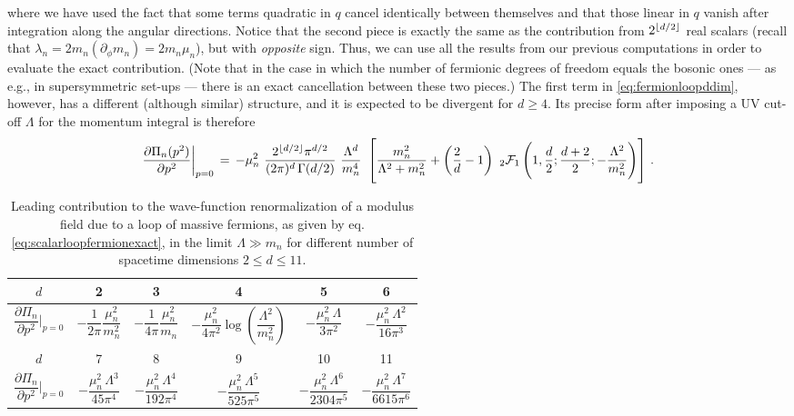 where we have used the fact that some terms quadratic in $q$ cancel identically between themselves and that those linear in $q$ vanish after integration along the angular directions. Notice that the second piece is exactly the same as the contribution from $2^{\lfloor d/2 \rfloor}$ real scalars (recall that $\lambda_n= 2 m_n (\partial_\phi m_n)=2 m_n \mu_n$), but with \emph{opposite} sign. Thus, we can use all the results from our previous computations in order to evaluate the exact contribution. (Note that in the case in which the number of fermionic degrees of freedom equals the bosonic ones --- as e.g., in supersymmetric set-ups --- there is an exact cancellation between these two pieces.) The first term in \eqref{eq:fermionloopddim}, however, has a different (although similar) structure, and it is expected to be divergent for $d\geq 4$. Its precise form after imposing a UV cut-off $\Lambda$ for the momentum integral is therefore
%
\begin{equation}
			\frac{\partial \Pi_n(p^2)}{\partial p^2} \bigg\rvert_{p=0}  \, =  \, - \mu_n^2  \ \frac{ \fdim \pi^{d/2}  }{  (2 \pi)^d \, \Gamma(d/2) } \ \frac{\Lambda^d}{m_n^4} \  \left[  \frac{m_n^2}{\Lambda^2+m_n^2}  + \left(\frac{2}{d}-1\right) \ _2{\cal F}_1\left( 1,\frac{d}{2};\frac{d+2}{2}; -\frac{\Lambda^2}{m_n^2}\right) \right]  \, .
\label{eq:scalarloopfermionexact}
\end{equation}
%
		\begin{table}[t]\begin{center}
				\renewcommand{\arraystretch}{2.00}
				\begin{tabular}{|c||c|c|c|c|c|}
					\hline
					$d$ & 2 & 3 & 4 & 5 & 6 \\
					\hline 
					$\dfrac {\partial \Pi_n}{\partial p^2} \bigg\rvert_{p=0}$ &
					$-\dfrac{1}{2 \pi}\dfrac{\mu_n^2}{m_n^2}$ & 
					$ -\dfrac{1}{4 \pi  }\dfrac{\mu_n^2}{m_n}$ &
					$ -\dfrac{\mu_n^2 }{4 \pi^2 } \log \left(\dfrac{\Lambda ^2}{m_n^2}\right)$ & 
					$ -\dfrac{\mu_n^2  \, \Lambda }{3 \pi^2}$ &
					$ -\dfrac{\mu_n^2  \, \Lambda^2 }{16 \pi^3} $ \\
					\hline 
					\hline
					$d$ &  7 & 8 & 9 & 10 & 11\\
					\hline 
					$\dfrac {\partial \Pi_n}{\partial p^2} \bigg\rvert_{p=0}$ &
					$  -\dfrac{\mu_n^2  \, \Lambda^3 }{45 \pi^4}  $ &
					$-\dfrac{\mu_n^2  \, \Lambda^4  }{192 \pi^4} $ &
					$ -\dfrac{\mu_n^2  \, \Lambda^5  }{525 \pi^5}$ &
					$ -\dfrac{\mu_n^2  \, \Lambda^6   }{2304 \pi^5}$ &
					$  -\dfrac{\mu_n^2  \, \Lambda^7 }{6615 \pi^6} $  \\
					\hline
				\end{tabular}
				\caption{Leading contribution to the wave-function renormalization of a modulus field due to a loop of massive fermions, as given by eq. \eqref{eq:scalarloopfermionexact}, in the limit $\Lambda\gg m_n$ for different number of spacetime dimensions $2 \leq d \leq 11$.}
				\label{tab:scalarloopfermionLambda>>m}\end{center}
		\end{table}  
